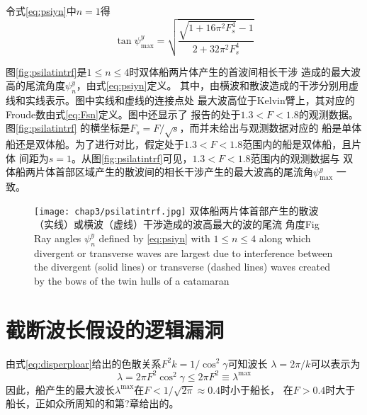 令式\eqref{eq:psiyn}中$n=1$得
\begin{equation}
  \tan\psi_{\max}^y=\sqrt{\frac{\sqrt{1+16\pi^2F_s^4}-1}{2+32\pi^2F_s^4}}
  \label{eq:psiymax}
\end{equation}

图\ref{fig:psilatintrf}是$1\le n\le4$时双体船两片体产生的首波间相长干涉
造成的最大波高的尾流角度$\psi_n^y$，由式\eqref{eq:psiyn}定义。
其中，由横波和散波造成的干涉分别用虚线和实线表示。图中实线和虚线的连接点处
最大波高位于Kelvin臂上，其对应的Froude数由式\eqref{eq:Fsn}定义。图中还显示了
\parencite{Rabaud2013Ship}报告的处于$1.3<F<1.8$的观测数据。图\ref{fig:psilatintrf}
的横坐标是$F_s=F/\sqrt{s}$，而\parencite{Rabaud2013Ship}并未给出与观测数据对应的
船是单体船还是双体船。为了进行对比，假定处于$1.3<F<1.8$范围内的船是双体船，且片体
间距为$s=1$。从图\ref{fig:psilatintrf}可见，$1.3<F<1.8$范围内的观测数据与
双体船两片体首部区域产生的散波间的相长干涉产生的最大波高的尾流角$\psi_{\max}^y$
一致。
%
\begin{figure}[htp]
  \centering
  \captionstyle{\centering}
  \texttt{[image: chap3/psilatintrf.jpg]}
  {双体船两片体首部产生的散波（实线）或横波（虚线）干涉造成的波高最大的波的尾流
  角度}{Fig}
  {Ray angles $\psi_n^y$ defined by \eqref{eq:psiyn} with $1\le n\le 4$ 
  along which divergent or transverse waves are
largest due to interference between the divergent (solid lines) or transverse
(dashed lines) waves created by the bows of the twin hulls of a catamaran}
\end{figure}

\section{截断波长假设的逻辑漏洞}
\label{sec:cutoffwavlen}

由式\eqref{eq:disperploar}给出的色散关系$F^2k=1/\cos^2\gamma$可知波长
$\lambda=2\pi/k$可以表示为
\begin{equation}
  \lambda=2\pi F^2\cos^2\gamma\le 2\pi F^2\equiv \lambda^{\max}
  \label{eq:wavlenchap3}
\end{equation}
因此，船产生的最大波长$\lambda^{\max}$在$F<1/\sqrt{2\pi}\approx0.4$时小于船长，
在$F>0.4$时大于船长，正如众所周知的和第?章给出的。

